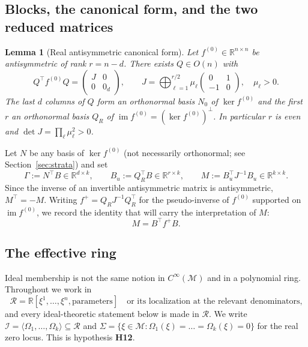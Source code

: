 \documentclass[12pt]{article}
\theoremstyle{plain}
\newtheorem{lemma}[theorem]{Lemma}
\theoremstyle{definition}
\theoremstyle{remark}
\newcommand{\R}{\mathbb{R}}
\DeclareMathOperator{\im}{im}
\newcommand{\Om}{\Omega}
\newcommand{\Mm}{\mathcal{M}}
\newcommand{\Ical}{\mathcal{I}}
\newcommand{\Rring}{\mathcal{R}}
\newcommand{\gen}[1]{\langle #1\rangle}
\begin{document}
	\subsection{Blocks, the canonical form, and the two reduced matrices}
	
	\begin{lemma}[Real antisymmetric canonical form]
		\label{lem:canonical}
		Let $f^{(0)}\in\R^{n\times n}$ be antisymmetric of rank $r=n-d$. There exists
		$Q\in O(n)$ with
		\begin{equation}
			Q^{\top}f^{(0)}Q=\begin{pmatrix}J&0\\0&0_{d}\end{pmatrix},
			\qquad
			J=\bigoplus_{\ell=1}^{r/2}\mu_{\ell}
			\begin{pmatrix}0&1\\-1&0\end{pmatrix},\quad\mu_{\ell}>0 .
			\label{eq:canonical}
		\end{equation}
		The last $d$ columns of $Q$ form an orthonormal basis $N_{0}$ of
		$\ker f^{(0)}$ and the first $r$ an orthonormal basis $Q_{R}$ of
		$\im f^{(0)}=(\ker f^{(0)})^{\perp}$. In particular $r$ is even and
		$\det J=\prod_{\ell}\mu_{\ell}^{2}>0$.
	\end{lemma}
	
	Let $N$ be any basis of $\ker f^{(0)}$ (not necessarily orthonormal; see
	Section~\ref{sec:strata}) and set
	\begin{equation}
		\Gamma:=N^{\top}B\in\R^{d\times k},
		\qquad
		B_{u}:=Q_{R}^{\top}B\in\R^{r\times k},
		\qquad
		M:=B_{u}^{\top}J^{-1}B_{u}\in\R^{k\times k}.
		\label{eq:GammaM}
	\end{equation}
	Since the inverse of an invertible antisymmetric matrix is antisymmetric,
	$M^{\top}=-M$. Writing $f^{+}=Q_{R}J^{-1}Q_{R}^{\top}$ for the pseudo-inverse of
	$f^{(0)}$ supported on $\im f^{(0)}$, we record the identity that will carry
	the interpretation of $M$:
	\begin{equation}
		M=B^{\top}f^{+}B .
		\label{eq:Mpseudo}
	\end{equation}
	
	\subsection{The effective ring}
	
	Ideal membership is not the same notion in $C^{\infty}(\Mm)$ and in a polynomial
	ring. Throughout we work in
	\begin{equation}
		\Rring=\R[\xi^{1},\dots,\xi^{n},\text{parameters}]
		\quad\text{or its localization at the relevant denominators,}
		\label{eq:ring}
	\end{equation}
	and every ideal-theoretic statement below is made in $\Rring$. We write
	$\Ical=\gen{\Om_{1},\dots,\Om_{k}}\subseteq\Rring$ and
	$\Sigma=\{\xi\in\Mm:\Om_{1}(\xi)=\dots=\Om_{k}(\xi)=0\}$ for the real zero
	locus. This is hypothesis \textbf{H12}.
	
\end{document}
